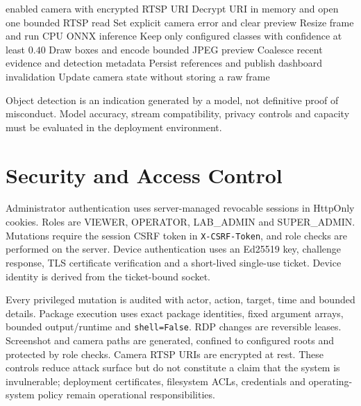 \documentclass[12pt,a4paper]{report}
\begin{document}
\begin{algorithm}[H]
\caption{Camera frame processing}
\label{alg:camera}
\begin{algorithmic}[1]
\Require enabled camera with encrypted RTSP URI
\State Decrypt URI in memory and open one bounded RTSP read
  \State Set explicit camera error and clear preview
\Else
  \State Resize frame and run CPU ONNX inference
  \State Keep only configured classes with confidence at least \(0.40\)
    \State Draw boxes and encode bounded JPEG preview
    \State Coalesce recent evidence and detection metadata
    \State Persist references and publish dashboard invalidation
  \Else
    \State Update camera state without storing a raw frame
  \EndIf
\EndIf
\end{algorithmic}
\end{algorithm}

Object detection is an indication generated by a model, not definitive proof
of misconduct. Model accuracy, stream compatibility, privacy controls and
capacity must be evaluated in the deployment environment.

\section{Security and Access Control}
Administrator authentication uses server-managed revocable sessions in
HttpOnly cookies. Roles are VIEWER, OPERATOR, LAB\_ADMIN and SUPER\_ADMIN.
Mutations require the session CSRF token in \texttt{X-CSRF-Token}, and role
checks are performed on the server. Device authentication uses an Ed25519
key, challenge response, TLS certificate verification and a short-lived
single-use ticket. Device identity is derived from the ticket-bound socket.

Every privileged mutation is audited with actor, action, target, time and
bounded details. Package execution uses exact package identities, fixed
argument arrays, bounded output/runtime and \texttt{shell=False}. RDP changes
are reversible leases. Screenshot and camera paths are generated, confined
to configured roots and protected by role checks. Camera RTSP URIs are
encrypted at rest. These controls reduce attack surface but do not constitute
a claim that the system is invulnerable; deployment certificates, filesystem
ACLs, credentials and operating-system policy remain operational
responsibilities.
\end{document}
